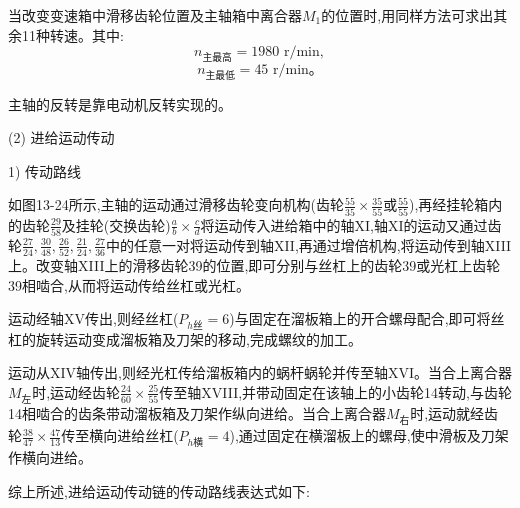 \documentclass[UTF8]{ctexbook}
\newcommand{\◎}{\ensuremath{\bigcirc}}
\begin{document}
当改变变速箱中滑移齿轮位置及主轴箱中离合器$M_1$的位置时,用同样方法可求出其余11种转速。其中:
\[ n_{\text{主最高}} = 1980 \text{ r/min}, \]
\[ n_{\text{主最低}} = 45 \text{ r/min}。 \]

主轴的反转是靠电动机反转实现的。

(2) 进给运动传动

1) 传动路线

如图13-24所示,主轴的运动通过滑移齿轮变向机构(齿轮$\frac{55}{35} \times \frac{35}{55}$或$\frac{55}{55}$),再经挂轮箱内的齿轮$\frac{29}{58}$及挂轮(交换齿轮)$\frac{a}{b} \times \frac{c}{d}$将运动传入进给箱中的轴XI,轴XI的运动又通过齿轮$\frac{27}{24}, \frac{30}{48}, \frac{26}{52}, \frac{21}{24}, \frac{27}{36}$中的任意一对将运动传到轴XII,再通过增倍机构,将运动传到轴XIII上。改变轴XIII上的滑移齿轮39的位置,即可分别与丝杠上的齿轮39或光杠上齿轮39相啮合,从而将运动传给丝杠或光杠。

运动经轴XV传出,则经丝杠($P_{h\text{丝}}=6$)与固定在溜板箱上的开合螺母配合,即可将丝杠的旋转运动变成溜板箱及刀架的移动,完成螺纹的加工。

运动从XIV轴传出,则经光杠传给溜板箱内的蜗杆蜗轮并传至轴XVI。当合上离合器$M_{\text{左}}$时,运动经齿轮$\frac{24}{60} \times \frac{25}{55}$传至轴XVIII,并带动固定在该轴上的小齿轮14转动,与齿轮14相啮合的齿条带动溜板箱及刀架作纵向进给。当合上离合器$M_{\text{右}}$时,运动就经齿轮$\frac{38}{47} \times \frac{47}{13}$传至横向进给丝杠($P_{h\text{横}}=4$),通过固定在横溜板上的螺母,使中滑板及刀架作横向进给。

综上所述,进给运动传动链的传动路线表达式如下:
\end{document}
